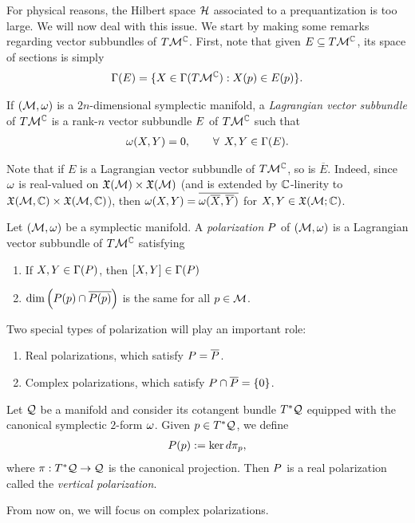 \documentclass[notas.tex]{subfiles}
\begin{document}
For physical reasons, the Hilbert space $\mathcal{H}$ associated to a prequantization is too large. We will now deal with this issue. We start by making some remarks regarding vector subbundles of $T\mathcal{M}^{\mathbb{C}}$. First, note that given $E \subseteq T\mathcal{M}^{\mathbb{C}}$, its space of sections is simply
\begin{align*}
	\Gamma(E) = \{X \in \Gamma(T\mathcal{M}^{\mathbb{C}}) : X(p) \in E(p) \}.
\end{align*}
\begin{defn}
	If $(\mathcal{M}, \omega)$ is a $2n$-dimensional symplectic manifold, a \emph{Lagrangian vector subbundle} of $T\mathcal{M}^{\mathbb{C}}$ is a rank-$n$ vector subbundle $E$ of $T\mathcal{M}^{\mathbb{C}}$ such that
\begin{align*}
	\sform(X, Y) = 0, \qquad \forall \, X,Y \in \sect(\vbund).
\end{align*}
\end{defn}
Note that if $E$ is a Lagrangian vector subbundle of $T \mathcal{M}^{\mathbb{C}}$, so is $\overline E$. Indeed, since $\omega$ is real-valued on $\mathfrak{X}(\mathcal{M}) \times \mathfrak{X}(\mathcal{M})$ (and is extended by $\mathbb{C}$-linerity to $\mathfrak{X}(\mathcal{M}, \mathbb{C}) \times \mathfrak{X}(\mathcal{M}, \mathbb{C})$), then $\omega(X,Y) = \overline{\omega(\overline X, \overline Y)}$ for $X,Y \in \mathfrak{X}(\mathcal{M}; \mathbb{C})$.
\begin{defn} \label{def_polarization}
Let $(\mathcal{M}, \omega)$ be a symplectic manifold. A \emph{polarization} $P$ of $(\mathcal{M},\omega)$ is a Lagrangian vector subbundle of $T\mathcal{M}^{\mathbb{C}}$ satisfying
\begin{enumerate}
	\item If $X, Y \in \Gamma(P)$, then $[X,Y] \in \Gamma(P)$
	\item $\dim \left( P(p) \cap \overline{P(p)} \right)$ is the same for all $p \in \mathcal{M}$.
\end{enumerate}
\end{defn}
\noindent Two special types of polarization will play an important role:
\begin{enumerate}
	\item Real polarizations, which satisfy $P = \overline{P}$.
	\item Complex polarizations, which satisfy $P \cap \overline{P} = \{0\}$.
\end{enumerate}


\begin{ex} \label{ex_vert_pol}
	Let $\mathcal{Q}$ be a manifold and consider its cotangent bundle $T^*\mathcal{Q}$ equipped with the canonical symplectic $2$-form $\omega$. Given $p \in T^*\mathcal{Q}$, we define
	\begin{align*}
		P(p) := \ker d\pi_p,
	\end{align*}
	where $\pi: T^* \mathcal{Q} \to \mathcal{Q}$ is the canonical projection. Then $P$ is a real polarization called the \emph{vertical polarization}.
\end{ex}
From now on, we will focus on complex polarizations.
\end{document}

